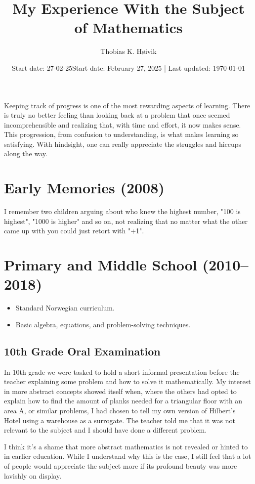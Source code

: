 \documentclass{article}
\title{My Experience With the Subject of Mathematics}
\author{Thobias K. Høivik}
\date{Start date: 27-02-25}
\date{Start date: February 27, 2025 | Last updated: \today}
\begin{document}
\maketitle
\section*{}
Keeping track of progress is one of the most rewarding aspects of learning. 
There is truly no better feeling than looking back at a problem that 
once seemed incomprehensible and realizing that, with time and effort, 
it now makes sense. 
This progression, from confusion to understanding, 
is what makes learning so satisfying. 
With hindsight, one can really appreciate the struggles and hiccups along the way.

\section{Early Memories (2008)}
I remember two children arguing about who knew the highest number, 
"100 is highest", "1000 is higher" and so on, not realizing that no matter what 
the other came up with you could just retort with "+1". 

\section{Primary and Middle School (2010--2018)}
\begin{itemize}
    \item Standard Norwegian curriculum.
    \item Basic algebra, equations, and problem-solving techniques.
\end{itemize}
\subsection*{10th Grade Oral Examination}
In 10th grade we were tasked to hold a short informal presentation before the teacher explaining some problem and how to solve it mathematically. 
My interest in more abstract concepts showed itself when, where the others had opted to explain how to find the amount of planks needed for a triangular floor with an area A, or similar problems, I had chosen to tell my own version of Hilbert's Hotel using a warehouse as a surrogate.
The teacher told me that it was not relevant to the subject and I should have done a different problem.

\noindent 
I think it's a shame that more abstract mathematics is not revealed or hinted 
to in earlier education. While I understand why this is the case, I still 
feel that a lot of people would appreciate the subject more if its profound 
beauty was more lavishly on display. 
\end{document}
